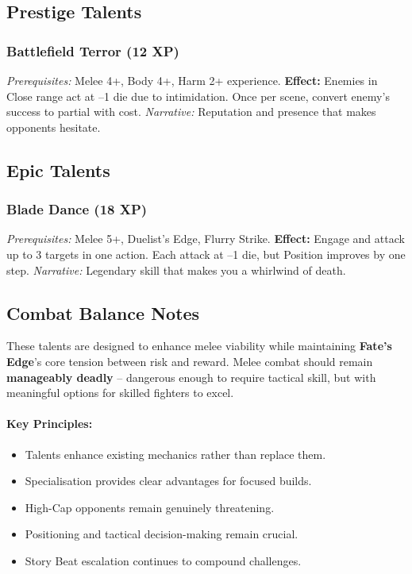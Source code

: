 \subsection{Prestige Talents}

\subsubsection{Battlefield Terror (12 XP)}\label{talent:battlefield_terror}
\textit{Prerequisites:} Melee 4+, Body 4+, Harm 2+ experience.
\textbf{Effect:} Enemies in Close range act at --1 die due to intimidation. Once per scene, convert enemy's success to partial with cost.
\textit{Narrative:} Reputation and presence that makes opponents hesitate.

\subsection{Epic Talents}

\subsubsection{Blade Dance (18 XP)}\label{talent:blade_dance}
\textit{Prerequisites:} Melee 5+, Duelist's Edge, Flurry Strike.
\textbf{Effect:} Engage and attack up to 3 targets in one action. Each attack at --1 die, but Position improves by one step.
\textit{Narrative:} Legendary skill that makes you a whirlwind of death.

\subsection{Combat Balance Notes}
These talents are designed to enhance melee viability while maintaining \textbf{Fate's Edge}'s core tension between risk and reward. Melee combat should remain \textbf{manageably deadly} -- dangerous enough to require tactical skill, but with meaningful options for skilled fighters to excel.

\paragraph{Key Principles:}
\begin{itemize}
    \item Talents enhance existing mechanics rather than replace them.
    \item Specialisation provides clear advantages for focused builds.
    \item High-Cap opponents remain genuinely threatening.
    \item Positioning and tactical decision-making remain crucial.
    \item Story Beat escalation continues to compound challenges.
\end{itemize}

